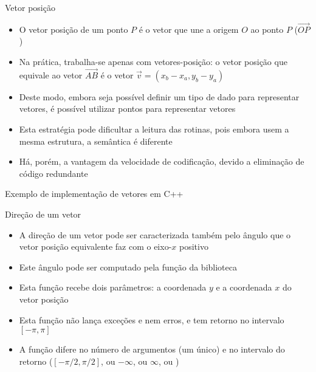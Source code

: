 \begin{frame}[fragile]{Vetor posição}

    \begin{itemize}
        \item O vetor posição de um ponto $P$ é o vetor que une a origem $O$ ao ponto $P$ 
            ($\overrightarrow{OP}$)
        \pause

        \item Na prática, trabalha-se apenas com vetores-posição: o vetor posição que equivale ao
            vetor $\overrightarrow{AB}$ é o vetor $\vec{v} = (x_b - x_a, y_b - y_a)$
        \pause

        \item Deste modo, embora seja possível definir um tipo de dado para representar vetores, é possível utilizar pontos para representar vetores
        \pause

        \item Esta estratégia pode dificultar a leitura das rotinas, pois embora usem a mesma estrutura, a semântica é diferente 
        \pause

        \item Há, porém, a vantagem da velocidade de codificação, devido a eliminação de código redundante
    \end{itemize}

\end{frame}

\begin{frame}[fragile]{Exemplo de implementação de vetores em C++}
\end{frame}

\begin{frame}[fragile]{Direção de um vetor}

    \begin{itemize}
        \item A direção de um vetor pode ser caracterizada também pelo ângulo que o vetor posição
            equivalente faz com o eixo-$x$ positivo
        \pause

        \item Este ângulo pode ser computado pela função  da biblioteca 
        \pause

        \item Esta função recebe dois parâmetros: a coordenada $y$ e a coordenada $x$ do
            vetor posição
        \pause

        \item Esta função não lança exceções e nem erros, e tem retorno no intervalo $[-\pi, \pi]$
        \pause

        \item A função  difere no número de argumentos (um único) e no intervalo do 
            retorno ($[-\pi/2, \pi/2]$, ou $-\infty$, ou $\infty$, ou )
    \end{itemize}

\end{frame}

